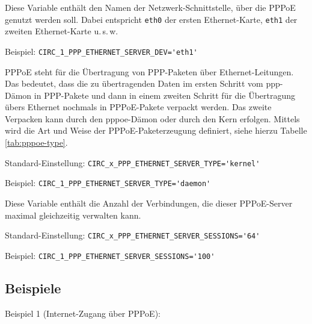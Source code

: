 \begin{description}

Diese Variable enthält den Namen der Netz\-werk-Schnittstelle, über die PPPoE
genutzt werden soll. Dabei entspricht \texttt{eth0} der ersten Ethernet-Karte,
\texttt{eth1} der zweiten Ethernet-Karte u.\,s.\,w.

Beispiel: \verb+CIRC_1_PPP_ETHERNET_SERVER_DEV='eth1'+


PPPoE steht für die Übertragung von PPP-Paketen über Ethernet-Leitungen. Das
bedeutet, dass die zu übertragenden Daten im ersten Schritt vom ppp-Dämon in
PPP-Pakete und dann in einem zweiten Schritt für die Übertragung übers Ethernet
nochmals in PPPoE-Pakete verpackt werden. Das zweite Verpacken kann durch den
pppoe-Dämon oder durch den Kern erfolgen. Mittels
 wird die Art und Weise der
PPPoE-Paketerzeugung definiert, siehe hierzu Tabelle \ref{tab:pppoe-type}.

Standard-Einstellung: \verb+CIRC_x_PPP_ETHERNET_SERVER_TYPE='kernel'+

Beispiel: \verb+CIRC_1_PPP_ETHERNET_SERVER_TYPE='daemon'+


Diese Variable enthält die Anzahl der Verbindungen, die dieser PPPoE-Server
maximal gleichzeitig verwalten kann.

Standard-Einstellung: \verb+CIRC_x_PPP_ETHERNET_SERVER_SESSIONS='64'+

Beispiel: \verb+CIRC_1_PPP_ETHERNET_SERVER_SESSIONS='100'+

\end{description}

\subsection{Beispiele}

\noindent
Beispiel 1 (Internet-Zugang über PPPoE):


